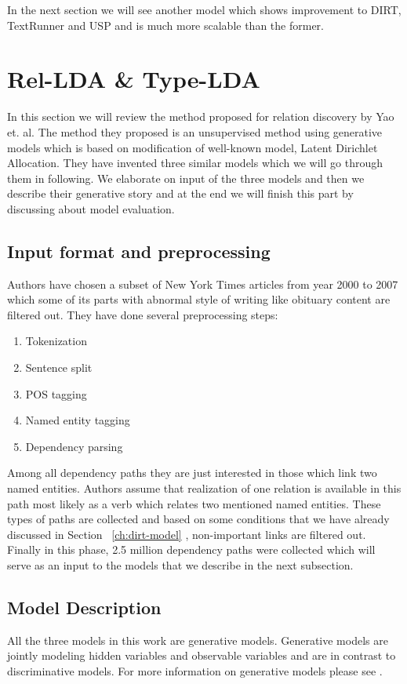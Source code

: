 \documentclass[12pt]{report}
\begin{document}
  In the next section we will see another model which shows improvement to DIRT, TextRunner and USP 
  and is much more scalable than the former.
     

\section{Rel-LDA \& Type-LDA}
\label{sec:rel-lda}

In this section we will review the method proposed for relation discovery  by Yao et. al. \cite{Riedel2013}  
The method they  proposed is an unsupervised method using generative models which is based on 
modification of well-known model, Latent Dirichlet Allocation. 
They have invented three similar models which we will go through them in following. 
We elaborate on input of the three models and then we describe their generative story 
and at the end we will finish this part by discussing about  model evaluation.

\subsection{Input format and preprocessing}
\label{ch:input}
Authors have chosen a subset of New York Times articles from year 2000 to 2007 which some of its parts with
abnormal style of writing like obituary content are filtered out.
They have done several preprocessing steps:
\begin{enumerate}
\item Tokenization
\item Sentence split
\item POS tagging %
\item Named entity tagging %
\item Dependency parsing %
\end{enumerate}
Among all dependency paths they are just interested in those which link two named entities.
 Authors assume that realization of one relation is available in this 
 path most likely as a verb which relates two mentioned named entities. These types of 
 paths are collected and based on some conditions that we have already discussed in Section ~\ref{ch:dirt-model} ,
  non-important links are filtered out.
 Finally in this phase, 2.5 million dependency paths were collected 
 which will serve as an input to the models that we describe in the next subsection.


\subsection {Model Description}
\label{ch:model}
All the three models in this work are generative models. Generative models are jointly modeling hidden variables and observable variables and 
are in contrast to discriminative models. For more information on generative models please see \cite{Murphy2012}.\\
\end{document}
